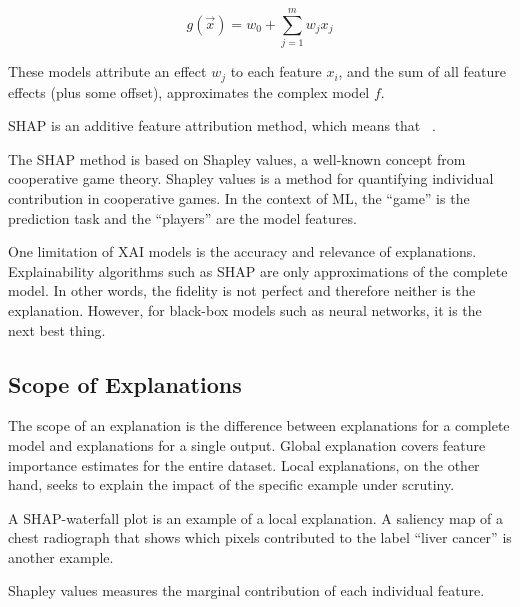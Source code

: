 \begin{equation}
    g(\vec{x}) 
    = w_{0} + \sum_{j=1}^{m} w_j x_{j}
\end{equation}

These models attribute an effect \(w_j\) to each feature \(x_i\),
and the sum of all feature effects (plus some offset), 
approximates the complex model \(f\).




\ac{SHAP} is an additive feature attribution method, 
which means that 
~\autocite{lundbergUnified2017}.


The \ac{SHAP} method is based on Shapley values,
a well-known concept from cooperative game theory.
Shapley values is a method for quantifying individual contribution
in cooperative games.
In the context of \ac{ML}, the \enquote{game} is the prediction task
and the \enquote{players} are the model features.

One limitation of XAI models is the accuracy and relevance of explanations.
Explainability algorithms such as SHAP are only approximations
of the complete model.
In other words, the fidelity is not perfect and therefore neither
is the explanation.
However, for black-box models such as neural networks,
it is the next best thing.

\subsection{Scope of Explanations}

The scope of an explanation is the difference between
explanations for a complete model and
explanations for a single output.
Global explanation covers feature importance estimates 
for the entire dataset.
Local explanations, on the other hand, seeks to explain
the impact of the specific example under scrutiny.

A SHAP-waterfall plot is an example of a local explanation.
A saliency map of a chest radiograph that shows
which pixels contributed to the label \enquote{liver cancer}
is another example.

Shapley values measures the marginal contribution
of each individual feature.


